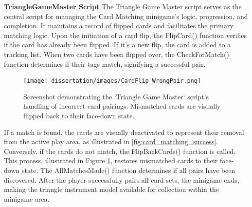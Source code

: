 \documentclass{l4proj}
\begin{document}
\textbf{TriangleGameMaster Script} \newline
The Triangle Game Master script serves as the central script for managing the Card Matching minigame's logic, progression, and completion. It maintains a record of flipped cards and facilitates the primary matching logic. Upon the initiation of a card flip, the FlipCard() function verifies if the card has already been flipped. If it's a new flip, the card is added to a tracking list. When two cards have been flipped over, the CheckForMatch() function determines if their tags match, signifying a successful pair.

\begin{figure}[h]
  \centering
  \texttt{[image: dissertation/images/CardFlip\_WrongPair.png]} 
  \caption{Screenshot demonstrating the `Triangle Game Master` script's handling of incorrect card pairings. Mismatched cards are visually flipped back to their face-down state.} 
  \label{fig:card_mismatch} 
\end{figure}

If a match is found, the cards are visually deactivated to represent their removal from the active play area, as illustrated in \ref{fig:card_matching_success}. Conversely, if the cards do not match, the FlipBackCards() function is called. This process, illustrated in Figure \ref{fig:card_mismatch}, restores mismatched cards to their face-down state. The AllMatchesMade() function determines if all pairs have been discovered. After the player successfully pairs all card sets, the minigame ends, making the triangle instrument model available for collection within the minigame area.
\end{document}
